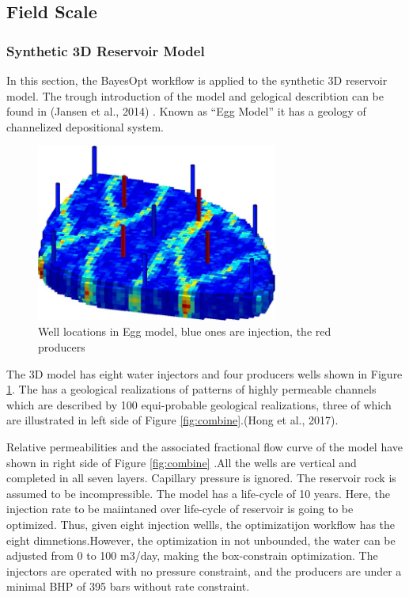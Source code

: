 \documentclass[]{elsarticle} %
\begin{document}
\begin{eqution}
\newpage

\hypertarget{field-scale}{%
\subsection{Field Scale}\label{field-scale}}

\hypertarget{synthetic-3d-reservoir-model}{%
\subsubsection{Synthetic 3D Reservoir Model}\label{synthetic-3d-reservoir-model}}

In this section, the BayesOpt workflow is applied to the synthetic 3D reservoir model. The trough introduction of the model and gelogical describtion can be found in (Jansen et al., 2014) . Known as ``Egg Model'' it has a geology of channelized depositional system.

\begin{figure}

{\centering \includegraphics[width=300px]{img/egg_base} 

}

\caption{Well locations in Egg model, blue ones are injection, the red producers}\label{fig:eggbase}
\end{figure}

The 3D model has eight water injectors and four producers wells shown in Figure \ref{fig:eggbase}. The has a geological realizations of patterns of highly permeable channels which are described by 100 equi-probable geological realizations, three of which are illustrated in left side of Figure \ref{fig:combine}.(Hong et al., 2017).

Relative permeabilities and the associated fractional flow curve of the model have shown in right side of Figure \ref{fig:combine} .All the wells are vertical and completed in all seven layers. Capillary pressure is ignored. The reservoir rock is assumed to be incompressible. The model has a life-cycle of 10 years. Here, the injection rate to be maiintaned over life-cycle of reservoir is going to be optimized. Thus, given eight injection wellls, the optimizatijon workflow has the eight dimnetions.However, the optimization in not unbounded, the water can be adjusted from 0 to 100 m3/day, making the box-constrain optimization. The injectors are operated with no pressure constraint, and the producers are under a minimal BHP of 395 bars without rate constraint.


\end{eqution}
\end{document}
